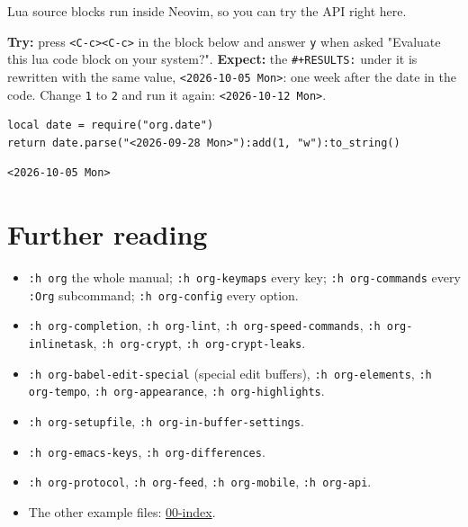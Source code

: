 Lua source blocks run inside Neovim, so you can try the API right here.

\textbf{Try:} press \texttt{<C-c><C-c>} in the block below and answer \texttt{y} when asked
"Evaluate this lua code block on your system?".
\textbf{Expect:} the \texttt{\#+RESULTS:} under it is rewritten with the same value,
\texttt{<2026-10-05 Mon>}: one week after the date in the code. Change \texttt{1} to
\texttt{2} and run it again: \texttt{<2026-10-12 Mon>}.

\begin{verbatim}
local date = require("org.date")
return date.parse("<2026-09-28 Mon>"):add(1, "w"):to_string()
\end{verbatim}

\label{org0373b60}
\begin{verbatim}
<2026-10-05 Mon>
\end{verbatim}
\section{Further reading}
\label{sec:org4cefeec}
\begin{itemize}
\item \texttt{:h org} the whole manual; \texttt{:h org-keymaps} every key; \texttt{:h org-commands}
every \texttt{:Org} subcommand; \texttt{:h org-config} every option.
\item \texttt{:h org-completion}, \texttt{:h org-lint}, \texttt{:h org-speed-commands},
\texttt{:h org-inlinetask}, \texttt{:h org-crypt}, \texttt{:h org-crypt-leaks}.
\item \texttt{:h org-babel-edit-special} (special edit buffers), \texttt{:h org-elements},
\texttt{:h org-tempo}, \texttt{:h org-appearance}, \texttt{:h org-highlights}.
\item \texttt{:h org-setupfile}, \texttt{:h org-in-buffer-settings}.
\item \texttt{:h org-emacs-keys}, \texttt{:h org-differences}.
\item \texttt{:h org-protocol}, \texttt{:h org-feed}, \texttt{:h org-mobile}, \texttt{:h org-api}.
\item The other example files: \href{00-index.org}{00-index}.
\end{itemize}
